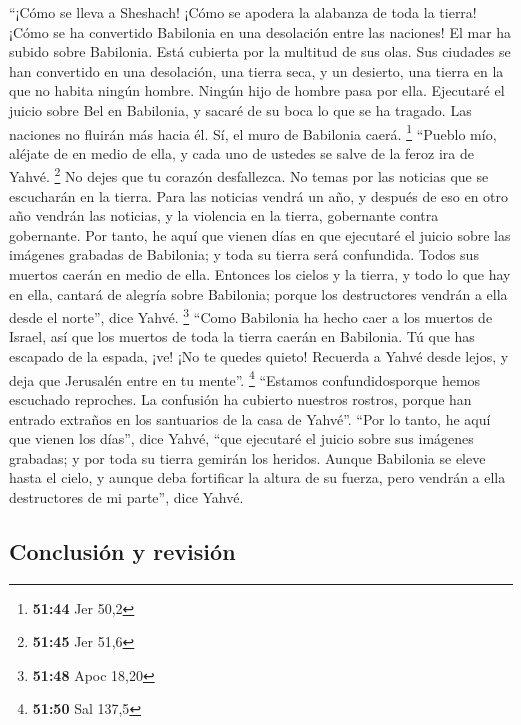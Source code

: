  ``¡Cómo se lleva a Sheshach! ¡Cómo se apodera la
alabanza de toda la tierra! ¡Cómo se ha convertido Babilonia en una
desolación entre las naciones!  El mar ha subido sobre
Babilonia. Está cubierta por la multitud de sus olas. 
Sus ciudades se han convertido en una desolación, una tierra seca, y un
desierto, una tierra en la que no habita ningún hombre. Ningún hijo de
hombre pasa por ella.  Ejecutaré el juicio sobre Bel en
Babilonia, y sacaré de su boca lo que se ha tragado. Las naciones no
fluirán más hacia él. Sí, el muro de Babilonia caerá. \footnote{\textbf{51:44}
  Jer 50,2}  ``Pueblo mío, aléjate de en medio de ella, y
cada uno de ustedes se salve de la feroz ira de Yahvé. \footnote{\textbf{51:45}
  Jer 51,6}  No dejes que tu corazón desfallezca. No
temas por las noticias que se escucharán en la tierra. Para las noticias
vendrá un año, y después de eso en otro año vendrán las noticias, y la
violencia en la tierra, gobernante contra gobernante. 
Por tanto, he aquí que vienen días en que ejecutaré el juicio sobre las
imágenes grabadas de Babilonia; y toda su tierra será confundida. Todos
sus muertos caerán en medio de ella.  Entonces los cielos
y la tierra, y todo lo que hay en ella, cantará de alegría sobre
Babilonia; porque los destructores vendrán a ella desde el norte'', dice
Yahvé. \footnote{\textbf{51:48} Apoc 18,20}  ``Como
Babilonia ha hecho caer a los muertos de Israel, así que los muertos de
toda la tierra caerán en Babilonia.  Tú que has escapado
de la espada, ¡ve! ¡No te quedes quieto! Recuerda a Yahvé desde lejos, y
deja que Jerusalén entre en tu mente''. \footnote{\textbf{51:50} Sal
  137,5}  ``Estamos confundidosporque hemos escuchado
reproches. La confusión ha cubierto nuestros rostros, porque han entrado
extraños en los santuarios de la casa de Yahvé''.  ``Por
lo tanto, he aquí que vienen los días'', dice Yahvé, ``que ejecutaré el
juicio sobre sus imágenes grabadas; y por toda su tierra gemirán los
heridos.  Aunque Babilonia se eleve hasta el cielo, y
aunque deba fortificar la altura de su fuerza, pero vendrán a ella
destructores de mi parte'', dice Yahvé.

\hypertarget{conclusiuxf3n-y-revisiuxf3n}{%
\subsection{Conclusión y revisión}\label{conclusiuxf3n-y-revisiuxf3n}}


